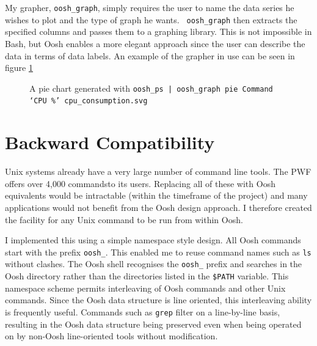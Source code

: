 \documentclass[12pt,twoside,notitlepage]{report}
\begin{document}
My grapher, {\tt oosh\_graph}, simply requires the user to name the
data series he wishes to plot and the type of graph he wants. {\tt
  oosh\_graph} then extracts the specified columns and passes them to
a graphing library. This is not impossible in Bash, but Oosh enables a
more elegant approach since the user can describe the data in terms of
data labels. An example of the grapher in use can be seen in figure
\ref{piegraph}

\begin{figure}[h]
  \centering
  \setlength\fboxsep{0.5pt}
  \setlength\fboxrule{0.5pt}
  \caption{A pie chart generated with {\tt oosh\_ps | oosh\_graph pie
      Command `CPU \%' cpu\_consumption.svg}}
  \label{piegraph}
\end{figure}

\section{Backward Compatibility}

Unix systems already have a very large number of command line
tools. The PWF offers over 4,000 commands\footnotemark[3] to its
users. Replacing all of these with Oosh equivalents would be
intractable (within the timeframe of the project) and many
applications would not benefit from the Oosh design approach. I
therefore created the facility for any Unix command to be run from
within Oosh.


I implemented this using a simple namespace style design. All Oosh
commands start with the prefix {\tt oosh\_}. This enabled me to reuse
command names such as {\tt ls} without clashes. The Oosh shell
recognises the {\tt oosh\_} prefix and searches in the Oosh directory
rather than the directories listed in the {\tt \$PATH} variable. This
namespace scheme permits interleaving of Oosh commands and other Unix
commands. Since the Oosh data structure is line oriented, this
interleaving ability is frequently useful. Commands such as {\tt grep}
filter on a line-by-line basis, resulting in the Oosh data structure
being preserved even when being operated on by non-Oosh line-oriented
tools without modification.
\end{document}
